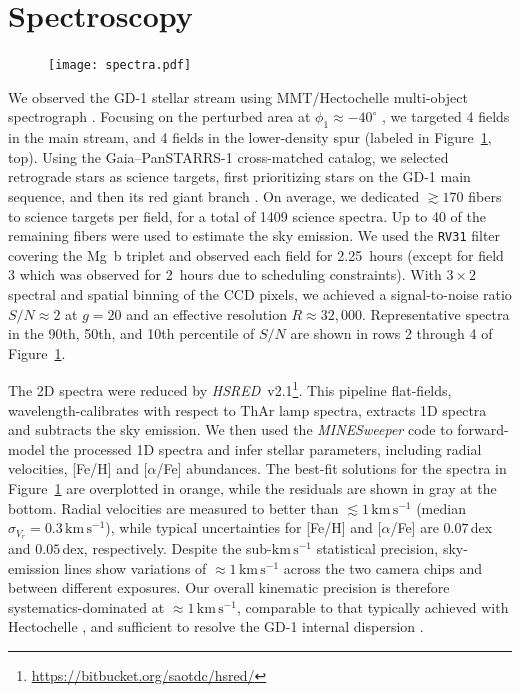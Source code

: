 \documentclass[twocolumn]{aastex63}
\newcommand{\package}[1]{\textsl{#1}}
\newcommand{\kms}{\ensuremath{\textrm{km}\,\textrm{s}^{-1}}}
\begin{document}


\section{Spectroscopy}
\label{sec:spec}

\begin{figure}
\begin{center}
\texttt{[image: spectra.pdf]}
\end{center}
\caption{
}
\label{fig:spectra}
\end{figure}

We observed the GD-1 stellar stream using MMT/Hectochelle multi-object spectrograph \citep{szentgyorgyi2011}.
Focusing on the perturbed area at $\phi_1\approx-40^\circ$ \citep[$\phi_{1,2}$ are coordinates oriented along and perpendicular to GD-1, respectively;][]{koposov2010}, we targeted 4 fields in the main stream, and 4 fields in the lower-density spur (labeled in Figure~\ref{fig:spectra}, top).
Using the Gaia--PanSTARRS-1 cross-matched catalog, we selected retrograde stars as science targets, first prioritizing stars on the GD-1 main sequence, and then its red giant branch \citep[see][]{pwb}.
On average, we dedicated $\gtrsim170$ fibers to science targets per field, for a total of 1409 science spectra.
Up to 40 of the remaining fibers were used to estimate the sky emission.
We used the \texttt{RV31} filter covering the Mg~b triplet and observed each field for 2.25~hours (except for field 3 which was observed for 2~hours due to scheduling constraints).
With $3\times2$ spectral and spatial binning of the CCD pixels, we achieved a signal-to-noise ratio $S/N\approx2$ at $g=20$ and an effective resolution $R\approx32,000$.
Representative spectra in the 90th, 50th, and 10th percentile of $S/N$ are shown in rows 2 through 4 of Figure~\ref{fig:spectra}.

The 2D spectra were reduced by \package{HSRED}~v2.1\footnote{\url{https://bitbucket.org/saotdc/hsred/}}.
This pipeline flat-fields, wavelength-calibrates with respect to ThAr lamp spectra, extracts 1D spectra and subtracts the sky emission.
We then used the \package{MINESweeper} code \citep{cargile2019} to forward-model the processed 1D spectra and infer stellar parameters, including radial velocities, [Fe/H] and [$\alpha$/Fe] abundances.
The best-fit solutions for the spectra in Figure~\ref{fig:spectra} are overplotted in orange, while the residuals are shown in gray at the bottom.
Radial velocities are measured to better than $\lesssim1\,\kms$ (median $\sigma_{V_r}=0.3\,\kms$), while typical uncertainties for [Fe/H] and [$\alpha$/Fe] are $0.07$\,dex and $0.05$\,dex, respectively.
Despite the sub-$\kms$ statistical precision, sky-emission lines show variations of $\approx1\,\kms$ across the two camera chips and between different exposures.
Our overall kinematic precision is therefore systematics-dominated at $\approx1\,\kms$, comparable to that typically achieved with Hectochelle \citep[e.g.,][]{caldwell2017}, and sufficient to resolve the GD-1 internal dispersion \citep{malhan2019}.
\end{document}
